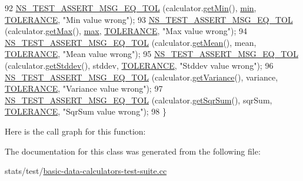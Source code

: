 \begin{DoxyCode}
92   \hyperlink{group__testing_ga9e7861b56b4e70db3b56044cb7a28e41}{NS\_TEST\_ASSERT\_MSG\_EQ\_TOL} (calculator.\hyperlink{classns3_1_1MinMaxAvgTotalCalculator_a6a506061da906ea3a1262a5f0394d68e}{getMin}(),      
      \hyperlink{80211b_8c_ac6afabdc09a49a433ee19d8a9486056d}{min},      \hyperlink{basic-data-calculators-test-suite_8cc_a89311a98397f9d6967d2cb10d5152d77}{TOLERANCE}, \textcolor{stringliteral}{"Min value wrong"});
93   \hyperlink{group__testing_ga9e7861b56b4e70db3b56044cb7a28e41}{NS\_TEST\_ASSERT\_MSG\_EQ\_TOL} (calculator.\hyperlink{classns3_1_1MinMaxAvgTotalCalculator_afb4430b9969e6acc05849bb9df444105}{getMax}(),      
      \hyperlink{80211b_8c_affe776513b24d84b39af8ab0930fef7f}{max},      \hyperlink{basic-data-calculators-test-suite_8cc_a89311a98397f9d6967d2cb10d5152d77}{TOLERANCE}, \textcolor{stringliteral}{"Max value wrong"});
94   \hyperlink{group__testing_ga9e7861b56b4e70db3b56044cb7a28e41}{NS\_TEST\_ASSERT\_MSG\_EQ\_TOL} (calculator.\hyperlink{classns3_1_1MinMaxAvgTotalCalculator_aba502282a75bae4c6f2f8f6fdc872cfe}{getMean}(),     mean,     
      \hyperlink{basic-data-calculators-test-suite_8cc_a89311a98397f9d6967d2cb10d5152d77}{TOLERANCE}, \textcolor{stringliteral}{"Mean value wrong"});
95   \hyperlink{group__testing_ga9e7861b56b4e70db3b56044cb7a28e41}{NS\_TEST\_ASSERT\_MSG\_EQ\_TOL} (calculator.\hyperlink{classns3_1_1MinMaxAvgTotalCalculator_a7dfbeb8a90ff11304b32df5f1b49482a}{getStddev}(),   stddev,   
      \hyperlink{basic-data-calculators-test-suite_8cc_a89311a98397f9d6967d2cb10d5152d77}{TOLERANCE}, \textcolor{stringliteral}{"Stddev value wrong"});
96   \hyperlink{group__testing_ga9e7861b56b4e70db3b56044cb7a28e41}{NS\_TEST\_ASSERT\_MSG\_EQ\_TOL} (calculator.\hyperlink{classns3_1_1MinMaxAvgTotalCalculator_a3dbf06a0a31cdab9dd780a6f263f6a55}{getVariance}(), variance, 
      \hyperlink{basic-data-calculators-test-suite_8cc_a89311a98397f9d6967d2cb10d5152d77}{TOLERANCE}, \textcolor{stringliteral}{"Variance value wrong"});
97   \hyperlink{group__testing_ga9e7861b56b4e70db3b56044cb7a28e41}{NS\_TEST\_ASSERT\_MSG\_EQ\_TOL} (calculator.\hyperlink{classns3_1_1MinMaxAvgTotalCalculator_a5f7ce191a74642f91590ede3c5c0315a}{getSqrSum}(),   sqrSum,   
      \hyperlink{basic-data-calculators-test-suite_8cc_a89311a98397f9d6967d2cb10d5152d77}{TOLERANCE}, \textcolor{stringliteral}{"SqrSum value wrong"});
98 \}
\end{DoxyCode}


Here is the call graph for this function\+:




The documentation for this class was generated from the following file\+:\begin{DoxyCompactItemize}
\item 
stats/test/\hyperlink{basic-data-calculators-test-suite_8cc}{basic-\/data-\/calculators-\/test-\/suite.\+cc}\end{DoxyCompactItemize}

